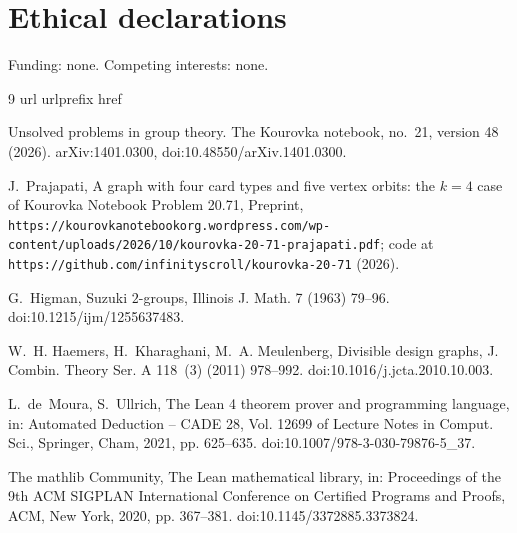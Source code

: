 \documentclass[preprint,12pt]{elsarticle}
\theoremstyle{definition}
\begin{document}
\section*{Ethical declarations}
Funding: none. Competing interests: none.

\begin{thebibliography}{9}
\expandafter\ifx\csname url\endcsname\relax
  \def\url#1{\texttt{#1}}\fi
\expandafter\ifx\csname urlprefix\endcsname\relax\def\urlprefix{URL }\fi
\expandafter\ifx\csname href\endcsname\relax
  \def\href#1#2{#2} \def\path#1{#1}\fi

Unsolved problems in group theory. {T}he {K}ourovka notebook, no.~21, version
  48 (2026).
\newblock \href {http://arxiv.org/abs/1401.0300} {\path{arXiv:1401.0300}},
  \href {https://doi.org/10.48550/arXiv.1401.0300}
  {\path{doi:10.48550/arXiv.1401.0300}}.

J.~Prajapati, A graph with four card types and five vertex orbits: the $k=4$
  case of {K}ourovka {N}otebook {P}roblem 20.71, Preprint,
  \url{https://kourovkanotebookorg.wordpress.com/wp-content/uploads/2026/10/kourovka-20-71-prajapati.pdf};
  code at \url{https://github.com/infinityscroll/kourovka-20-71} (2026).

G.~Higman, Suzuki $2$-groups, Illinois J. Math. 7 (1963) 79--96.
\newblock \href {https://doi.org/10.1215/ijm/1255637483}
  {\path{doi:10.1215/ijm/1255637483}}.

W.~H. Haemers, H.~Kharaghani, M.~A. Meulenberg, Divisible design graphs, J.
  Combin. Theory Ser. A 118~(3) (2011) 978--992.
\newblock \href {https://doi.org/10.1016/j.jcta.2010.10.003}
  {\path{doi:10.1016/j.jcta.2010.10.003}}.

L.~de~Moura, S.~Ullrich, The {L}ean 4 theorem prover and programming language,
  in: Automated Deduction -- CADE 28, Vol. 12699 of Lecture Notes in Comput.
  Sci., Springer, Cham, 2021, pp. 625--635.
\newblock \href {https://doi.org/10.1007/978-3-030-79876-5_37}
  {\path{doi:10.1007/978-3-030-79876-5_37}}.

{The mathlib Community}, The {L}ean mathematical library, in: Proceedings of
  the 9th ACM SIGPLAN International Conference on Certified Programs and
  Proofs, ACM, New York, 2020, pp. 367--381.
\newblock \href {https://doi.org/10.1145/3372885.3373824}
  {\path{doi:10.1145/3372885.3373824}}.

\end{thebibliography}
\end{document}
